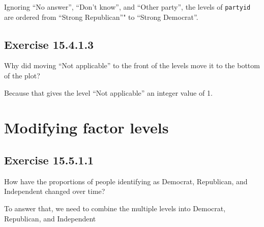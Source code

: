 \documentclass[]{book}
\newenvironment{Shaded}{\begin{snugshade}}{\end{snugshade}}
\newcommand{\CommentTok}[1]{\textcolor[rgb]{0.56,0.35,0.01}{\textit{#1}}}
\newcommand{\KeywordTok}[1]{\textcolor[rgb]{0.13,0.29,0.53}{\textbf{#1}}}
\newcommand{\NormalTok}[1]{#1}
\newcommand{\OperatorTok}[1]{\textcolor[rgb]{0.81,0.36,0.00}{\textbf{#1}}}
\theoremstyle{plain}
\theoremstyle{remark}
\begin{document}
Ignoring ``No answer'', ``Don't know'', and ``Other party'', the levels
of \texttt{partyid} are ordered from ``Strong Republican''" to ``Strong
Democrat''.

\begin{Shaded}
\end{Shaded}

\hypertarget{exercise-15.4.1.3}{%
\subsection*{\texorpdfstring{Exercise
{15.4.1.3}}{Exercise 15.4.1.3}}\label{exercise-15.4.1.3}}

Why did moving ``Not applicable'' to the front of the levels move it to
the bottom of the plot?

Because that gives the level ``Not applicable'' an integer value of 1.

\hypertarget{modifying-factor-levels}{%
\section{Modifying factor levels}\label{modifying-factor-levels}}

\hypertarget{exercise-15.5.1.1}{%
\subsection*{\texorpdfstring{Exercise
{15.5.1.1}}{Exercise 15.5.1.1}}\label{exercise-15.5.1.1}}

How have the proportions of people identifying as Democrat, Republican,
and Independent changed over time?

To answer that, we need to combine the multiple levels into Democrat,
Republican, and Independent

\begin{Shaded}
\end{Shaded}
\end{document}
